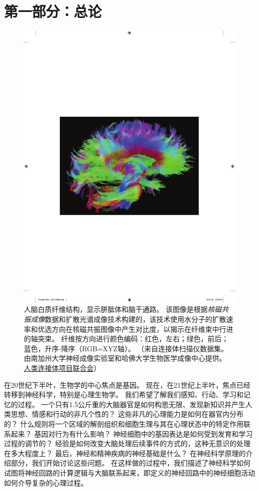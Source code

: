 \chapter*{第一部分：总论}

\begin{figure}[htbp]
	\centering
	\includegraphics[width=1.0\linewidth]{chap01/fig_1_0}
	\caption{人脑白质纤维结构，显示胼胝体和脑干通路。
		该图像是根据\textit{核磁共振成像}数据和扩散光谱成像技术构建的，该技术使用水分子的扩散速率和优选方向在核磁共振图像中产生对比度，以揭示在纤维束中行进的轴突束。
		纤维按方向进行颜色编码：红色，左右；绿色，前后；蓝色，升序-降序（RGB=XYZ轴）。
		（来自连接体扫描仪数据集。
		由南加州大学神经成像实验室和哈佛大学生物医学成像中心提供。
		\href{www.humanconnetomproject.org}{人类连接体项目联合会}）}
	\label{fig:1_0}
\end{figure}

在20世纪下半叶，生物学的中心焦点是基因。
现在，在21世纪上半叶，焦点已经转移到神经科学，特别是心理生物学。
我们希望了解我们感知、行动、学习和记忆的过程。
一个只有1.5公斤重的大脑器官是如何构思无限、发现新知识并产生人类思想、情感和行动的非凡个性的？
这些非凡的心理能力是如何在器官内分布的？
什么规则将一个区域的解剖组织和细胞生理与其在心理状态中的特定作用联系起来？
基因对行为有什么影响？
神经细胞中的基因表达是如何受到发育和学习过程的调节的？
经验是如何改变大脑处理后续事件的方式的，这种无意识的处理在多大程度上？
最后，神经和精神疾病的神经基础是什么？
在神经科学原理的介绍部分，我们开始讨论这些问题。
在这样做的过程中，我们描述了神经科学如何试图将神经回路的计算逻辑与大脑联系起来，即定义的神经回路中的神经细胞活动如何介导复杂的心理过程。


